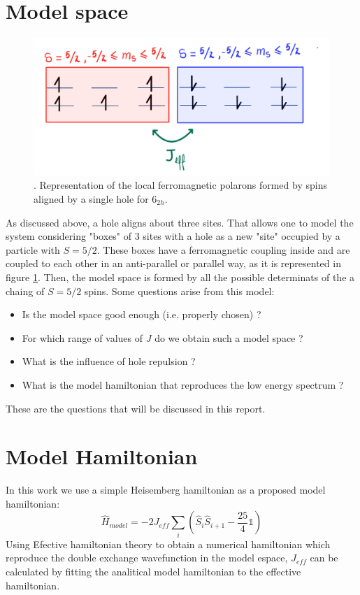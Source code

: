 \documentclass[12pt,twoside]{report}
\begin{document}
	\section{Model space}
	\begin{figure}[ht]
		\centering
			\includegraphics[scale=0.25]{boites.png}
		\caption{\label{boites}. Representation of the local ferromagnetic polarons formed by spins aligned by a single hole for 6$_{2h}$.}
	\end{figure}
	As discussed above, a hole aligns about three sites. That allows one to
	model the system considering "boxes" of 3 sites with a hole as a new "site"
	occupied by a particle with  $S=5 \slash 2$. These boxes have a
	ferromagnetic coupling inside and are coupled to each other in an
	anti-parallel or parallel way, as it is represented in figure \ref{boites}.
	Then, the model space is formed by all the possible determinats of the a
	chaing of $S=5 \slash 2$ spins. Some questions arise from this model:
	\begin{itemize}
	    \item Is the model space good enough (i.e. properly chosen) ?
	    \item For which range of values of $J$ do we obtain such a model space ?
	    \item What is the influence of hole repulsion ?
	    \item What is the model hamiltonian that reproduces the low energy spectrum ?
	\end{itemize}
	These are the questions that will be discussed in this report.
	
	
	\section{Model Hamiltonian}
	In this work we use a simple Heisemberg hamiltonian as a proposed model hamiltonian:
	\begin{equation}
	\hat{H}_{model}=-2J_{eff}\sum_i (\hat{S}_i\hat{S}_{i+1}-\frac{25}{4}\mathbb{1})
	\end{equation}
	Using Efective hamiltonian theory \cite{heff} to obtain a numerical hamiltonian which reproduce the double exchange wavefunction in the model espace, $J_{eff}$ can be calculated by fitting the analitical model hamiltonian to the effective hamiltonian.
\end{document}
